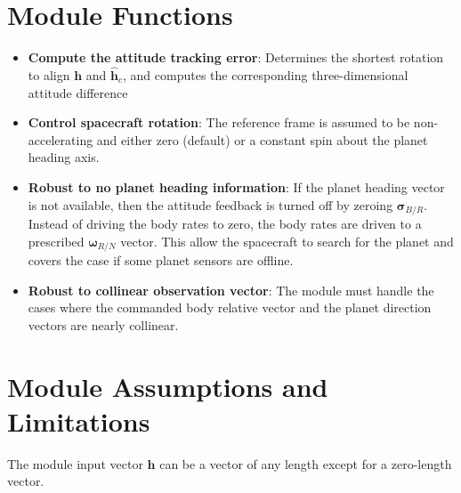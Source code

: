 

\section{Module Functions}
\begin{itemize}
	\item \textbf{Compute the attitude tracking error}: Determines the shortest rotation to align $\bm h$ and $\hat{\bm h}_{c}$, and computes the corresponding three-dimensional attitude difference
	\item \textbf{Control spacecraft rotation}: The reference frame is assumed to be non-accelerating and either zero (default) or a constant spin about the planet heading axis.

	\item \textbf{Robust to no planet heading information}: If the planet heading vector is not available, then the attitude feedback is turned off by zeroing $\bm\sigma_{B/R}$.  Instead of driving the body rates to zero, the body rates are driven to a prescribed $\bm\omega_{R/N}$ vector.  This allow the spacecraft to search for the planet and covers the case if some planet sensors are offline.

	\item \textbf{Robust to collinear observation vector}:  The module must handle the cases where the commanded body relative vector and the planet direction vectors are nearly collinear.
\end{itemize}

\section{Module Assumptions and Limitations}
The module input vector $\bm h$ can be a vector of any length except for a zero-length vector.  %
